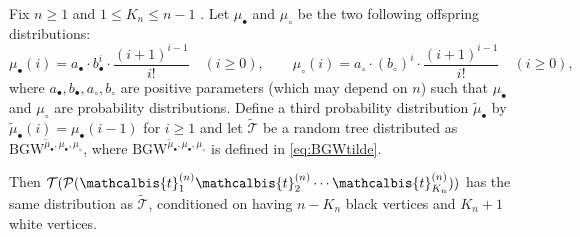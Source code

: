 \documentclass[AHL,XML,longabstracts,Unicode]{cedram}
\def\PPP{\mathcal P}
\def\tmub{\widetilde{\mu}_{\bullet}}
\def\ab{a_{\bullet}}
\def\ac{a_{\circ}}
\def\bb{b_{\bullet}}
\def\bc{b_{\circ}}
\def\mub{\mu_{\bullet}}
\def\muc{\mu_{\circ}}
\def\tTs{\tilde{\Ts}}
\newcommand\BGW{\textrm{BGW}}
\def\tb{\mathcalbis{t}}
\def\Ts{\mathscr{T}}
\begin{document}
\begin{proposition}\label{prop:bitype}
Fix $n \geq 1$ and $1 \leq K_{n} \leq n-1$ . Let $\mub$ and $\muc$ be the two following offspring distributions:
\[\mub(i)= \ab \cdot  \bb^{i} \cdot \frac{(i+1)^{i-1}}{i!}  \quad (i \geq 0), \qquad \muc(i)= \ac \cdot  (\bc)^{i} \cdot \frac{(i+1)^{i-1}}{i!}  \quad (i \geq 0),\]
where $\ab,\bb,\ac,\bc$ are positive parameters (which may depend on $n$)
such that $\mub$ and $\muc$ are probability distributions.
Define a third probability distribution $\widetilde{\mu}_{\bullet}$
 by $\widetilde{\mu}_{\bullet}(i)=\mub(i-1)$ for $i \geq 1$
 and let $ \tTs$ be a random tree distributed as ${\BGW}^{\tmub,\mub,\muc}$,
 where ${\BGW}^{\tmub,\mub,\muc}$ is defined in \eqref{eq:BGWtilde}.

Then $ \mathcal{T}( \PPP( \tb_{1}^{(n)} \tb_{2}^{(n)} \cdots \tb_{K_{n}}^{(n)}))$ has the same distribution as $ \tilde{\mathscr{T}}$, conditioned on having $n-K_{n}$ black vertices and $K_{n}+1$ white vertices.
\end{proposition}
\end{document}
